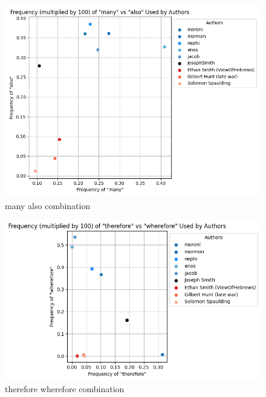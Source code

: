\documentclass[
  letterpaper,
  DIV=11,
  numbers=noendperiod]{scrartcl}
\begin{document}
\begin{figure}

{\centering \includegraphics{Graphs/Word Comparisons/many_also_output.png}

}

\caption{many also combination}

\end{figure}

\begin{figure}

{\centering \includegraphics{Graphs/Word Comparisons/therefore_wherefore_output.png}

}

\caption{therefore wherefore combination}

\end{figure}
\end{document}
